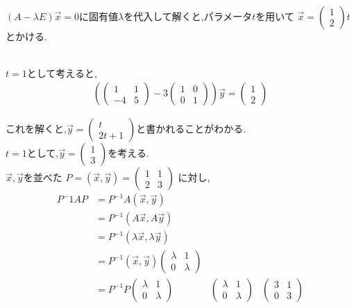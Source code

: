 \documentclass{jsarticle}
\begin{document}
\leavevmode\\
$(A-\lambda E)\overrightarrow{x} = 0$に固有値$\lambda $を代入して解くと,パラメータ$t$を用いて
$\overrightarrow{x} = \begin{pmatrix}1\\2 \end{pmatrix} t$とかける.

\leavevmode\\
$t=1$として考えると,
  \begin{align*}
    \left(
      \begin{pmatrix}
        1 & 1\\
        -4 & 5
      \end{pmatrix}
      -3\begin{pmatrix}
        1 & 0\\
        0 & 1
      \end{pmatrix}
    \right)\overrightarrow{y} = \begin{pmatrix} 1\\2 \end{pmatrix}
  \end{align*}

これを解くと,$\overrightarrow{y} = \begin{pmatrix} t\\2t+1 \end{pmatrix}$と書かれることがわかる.
\leavevmode\\
$t=1$として,$\overrightarrow{y} =\begin{pmatrix} 1\\3 \end{pmatrix}$を考える.
\leavevmode\\
$\overrightarrow{x},\overrightarrow{y} $を並べた
$P = (\overrightarrow{x},\overrightarrow{y}) = \begin{pmatrix} 1&1\\2&3 \end{pmatrix}$
に対し,
  \begin{align*}
  P^-1AP &= P^{-1}A(\overrightarrow{x},\overrightarrow{y})\\  
         &= P^{-1}(A \overrightarrow{x},A \overrightarrow{y})\\
         &= P^{-1}(\lambda \overrightarrow{x},\lambda \overrightarrow{y})\\
         &= P^{-1}(\overrightarrow{x},\overrightarrow{y})\begin{pmatrix} \lambda &1\\0&\lambda \end{pmatrix}\\
         &= P^{-1}P\begin{pmatrix} \lambda &1\\0&\lambda  \end{pmatrix}
         &\begin{pmatrix} \lambda &1\\0&\lambda  \end{pmatrix}
         &\begin{pmatrix}  3&1\\0&3  \end{pmatrix}
  \end{align*}
\end{document}
